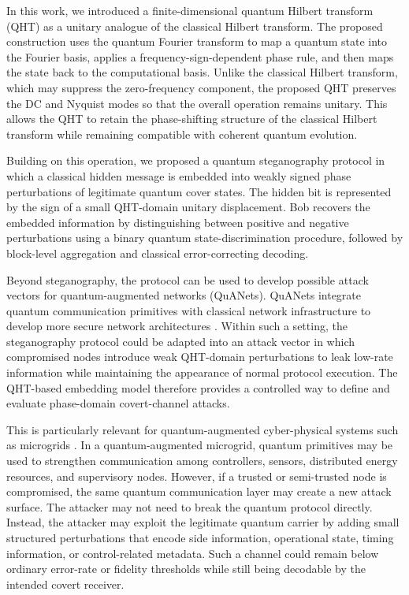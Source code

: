 \documentclass[11pt]{article}
\theoremstyle{plain}
\theoremstyle{definition}
\theoremstyle{remark}
\begin{document}
In this work, we introduced a finite-dimensional quantum Hilbert transform (QHT) as a unitary analogue of the classical Hilbert transform. The proposed construction uses the quantum Fourier transform to map a quantum state into the Fourier basis, applies a frequency-sign-dependent phase rule, and then maps the state back to the computational basis. Unlike the classical Hilbert transform, which may suppress the zero-frequency component, the proposed QHT preserves the DC and Nyquist modes so that the overall operation remains unitary. This allows the QHT to retain the phase-shifting structure of the classical Hilbert transform while remaining compatible with coherent quantum evolution.

Building on this operation, we proposed a quantum steganography protocol in which a classical hidden message is embedded into weakly signed phase perturbations of legitimate quantum cover states. The hidden bit is represented by the sign of a small QHT-domain unitary displacement. Bob recovers the embedded information by distinguishing between positive and negative perturbations using a binary quantum state-discrimination procedure, followed by block-level aggregation and classical error-correcting decoding.

Beyond steganography, the protocol can be used to develop possible attack vectors for quantum-augmented networks (QuANets). QuANets integrate quantum communication primitives with classical network infrastructure to develop more secure network architectures \citep{jha2024ml,jha2025towards,jha2025quantum}. Within such a setting, the steganography protocol could be adapted into an attack vector in which compromised nodes introduce weak QHT-domain perturbations to leak low-rate information while maintaining the appearance of normal protocol execution. The QHT-based embedding model therefore provides a controlled way to define and evaluate phase-domain covert-channel attacks.

This is particularly relevant for quantum-augmented cyber-physical systems such as microgrids \citep{jha2026novel}. In a quantum-augmented microgrid, quantum primitives may be used to strengthen communication among controllers, sensors, distributed energy resources, and supervisory nodes. However, if a trusted or semi-trusted node is compromised, the same quantum communication layer may create a new attack surface. The attacker may not need to break the quantum protocol directly. Instead, the attacker may exploit the legitimate quantum carrier by adding small structured perturbations that encode side information, operational state, timing information, or control-related metadata. Such a channel could remain below ordinary error-rate or fidelity thresholds while still being decodable by the intended covert receiver.
\end{document}
